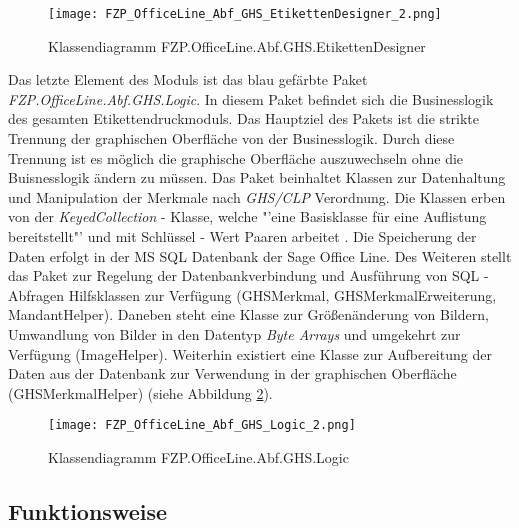 \begin{figure}[H]
    \centering
    \texttt{[image: FZP\_OfficeLine\_Abf\_GHS\_EtikettenDesigner\_2.png]}
    \caption[Klassendiagramm FZP.OfficeLine.Abf.GHS.EtikettenDesigner]
    {\small{Klassendiagramm FZP.OfficeLine.Abf.GHS.EtikettenDesigner}}
    \label{fig:kdetikettendesigner}
\end{figure}

\noindent
Das letzte Element des Moduls ist das blau gefärbte Paket \emph{FZP.OfficeLine.Abf.GHS.Logic}.
In diesem Paket befindet sich die Businesslogik des gesamten Etikettendruckmoduls. Das 
Hauptziel des Pakets ist die strikte Trennung der graphischen Oberfläche von der 
Businesslogik. Durch diese Trennung ist es möglich die graphische Oberfläche auszuwechseln ohne 
die Buisnesslogik ändern zu müssen. Das Paket beinhaltet Klassen zur Datenhaltung und Manipulation 
der Merkmale nach \emph{GHS/CLP} Verordnung. Die Klassen erben von der \emph{KeyedCollection} - Klasse, 
welche "'eine Basisklasse für eine Auflistung bereitstellt"' und mit Schlüssel - Wert Paaren 
arbeitet \cite{coll}. Die Speicherung der Daten erfolgt in der MS SQL Datenbank der Sage 
Office Line. Des Weiteren stellt das Paket zur Regelung der Datenbankverbindung und Ausführung 
von SQL - Abfragen Hilfsklassen zur Verfügung (GHSMerkmal, GHSMerkmalErweiterung, MandantHelper). 
Daneben steht eine Klasse zur Größenänderung von Bildern, Umwandlung von Bilder in den Datentyp 
\emph{Byte Arrays} und umgekehrt zur Verfügung (ImageHelper). Weiterhin existiert eine Klasse zur
Aufbereitung der Daten aus der Datenbank zur Verwendung in der graphischen Oberfläche (GHSMerkmalHelper) 
(siehe Abbildung \ref{fig:kdlogik}).

\begin{figure}[H]
    \centering
    \texttt{[image: FZP\_OfficeLine\_Abf\_GHS\_Logic\_2.png]}
    \caption[Klassendiagramm FZP.OfficeLine.Abf.GHS.Logic]
    {\small{Klassendiagramm FZP.OfficeLine.Abf.GHS.Logic}}
    \label{fig:kdlogik}
\end{figure}

\subsection{Funktionsweise}

